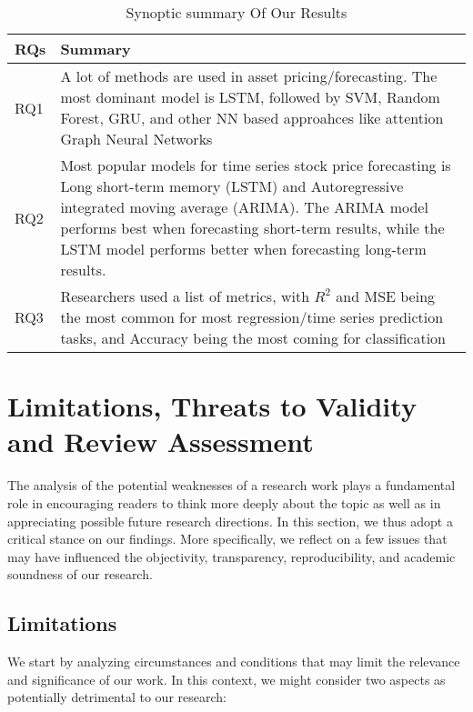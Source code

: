 \documentclass[11pt]{article}
\begin{document}
 \begin{table}
\caption{Synoptic summary Of Our Results}
\label{T:synoptic summary}
\begin{tabularx}{\columnwidth}{X p{6.0cm}}
\toprule
RQs & Summary \\
\midrule
RQ1 & A lot of methods are used in asset pricing/forecasting. The most dominant model is LSTM, followed by SVM, Random Forest, GRU, and other NN based approahces like attention Graph Neural Networks \\
RQ2  &  Most popular models for time series stock price forecasting is Long short-term memory (LSTM) and Autoregressive integrated moving average (ARIMA). The ARIMA model performs best when forecasting short-term results, while the LSTM model performs better when forecasting long-term results. \\
RQ3 & Researchers used a list of metrics, with $R^2$ and MSE being the most common for most regression/time series prediction tasks, and Accuracy being the most coming for classification  \\


\midrule
\end{tabularx}
\end{table}

\section{Limitations, Threats to Validity and Review Assessment}\label{S:limitationsThreatsAssessment}

The analysis of the potential weaknesses of a research work plays a fundamental role in encouraging readers to think more deeply about the topic  as well as in appreciating possible future research directions. In this section, we thus adopt a critical stance on our findings. More specifically, we reflect on a few issues that may have influenced the objectivity, transparency, reproducibility, and academic soundness of our research.  

\subsection{Limitations}\label{S:limitations}
We start by analyzing circumstances and conditions that may limit the relevance and significance of our work. In this context, we might consider two aspects as potentially detrimental to our research:
\end{document}
